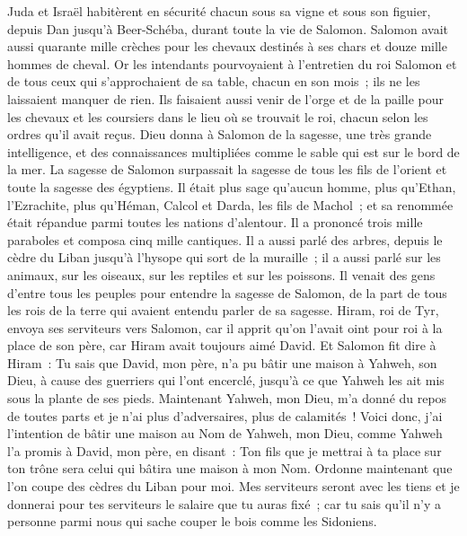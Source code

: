 \begin{multicols}{2}
Juda et Israël habitèrent en sécurité chacun sous sa vigne et sous son figuier, depuis Dan jusqu'à Beer-Schéba, durant toute la vie de Salomon.
Salomon avait aussi quarante mille crèches pour les chevaux destinés à ses chars et douze mille hommes de cheval.
Or les intendants pourvoyaient à l'entretien du roi Salomon et de tous ceux qui s'approchaient de sa table, chacun en son mois~; ils ne les laissaient manquer de rien.
Ils faisaient aussi venir de l'orge et de la paille pour les chevaux et les coursiers dans le lieu où se trouvait le roi, chacun selon les ordres qu'il avait reçus.
Dieu donna à Salomon de la sagesse, une très grande intelligence, et des connaissances multipliées comme le sable qui est sur le bord de la mer.
La sagesse de Salomon surpassait la sagesse de tous les fils de l'orient et toute la sagesse des égyptiens.
Il était plus sage qu'aucun homme, plus qu'Ethan, l'Ezrachite, plus qu'Héman, Calcol et Darda, les fils de Machol~; et sa renommée était répandue parmi toutes les nations d'alentour.
Il a prononcé trois mille paraboles et composa cinq mille cantiques.
Il a aussi parlé des arbres, depuis le cèdre du Liban jusqu'à l'hysope qui sort de la muraille~; il a aussi parlé sur les animaux, sur les oiseaux, sur les reptiles et sur les poissons.
Il venait des gens d'entre tous les peuples pour entendre la sagesse de Salomon, de la part de tous les rois de la terre qui avaient entendu parler de sa sagesse.
\VerseOne{}Hiram, roi de Tyr, envoya ses serviteurs vers Salomon, car il apprit qu'on l'avait oint pour roi à la place de son père, car Hiram avait toujours aimé David.
Et Salomon fit dire à Hiram~:
Tu sais que David, mon père, n'a pu bâtir une maison à Yahweh, son Dieu, à cause des guerriers qui l'ont encerclé, jusqu'à ce que Yahweh les ait mis sous la plante de ses pieds.
Maintenant Yahweh, mon Dieu, m'a donné du repos de toutes parts et je n'ai plus d'adversaires, plus de calamités~!
Voici donc, j'ai l'intention de bâtir une maison au Nom de Yahweh, mon Dieu, comme Yahweh l'a promis à David, mon père, en disant~: Ton fils que je mettrai à ta place sur ton trône sera celui qui bâtira une maison à mon Nom.
Ordonne maintenant que l'on coupe des cèdres du Liban pour moi. Mes serviteurs seront avec les tiens et je donnerai pour tes serviteurs le salaire que tu auras fixé~; car tu sais qu'il n'y a personne parmi nous qui sache couper le bois comme les Sidoniens.

\end{multicols}
